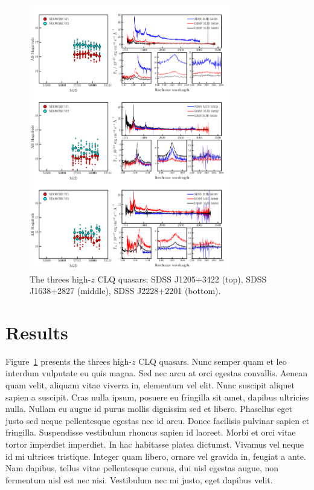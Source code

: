 \documentclass[a4paper,fleqn,usenatbib]{mnras}
\begin{document}
\begin{figure}
  \centering
  \includegraphics[width=8.7cm, trim=0.2cm 0.2cm 0.2cm 0.2cm, clip]
  {../plots/spectral/The_3_CIV_CLQs_20190917.pdf}
   \vspace{-12pt}
  \caption[]{The threes high-$z$ CLQ quasars; 
SDSS J1205+3422 (top), 
SDSS J1638+2827 (middle), 
SDSS J2228+2201 (bottom). 
}
  \label{fig:civ_clqs}
\end{figure}
\section{Results}
Figure~\ref{fig:civ_clqs} presents the threes high-$z$ CLQ quasars. 
Nunc semper quam et leo interdum vulputate eu quis magna. Sed nec arcu
at orci egestas convallis. Aenean quam velit, aliquam vitae viverra
in, elementum vel elit. Nunc suscipit aliquet sapien a suscipit. Cras
nulla ipsum, posuere eu fringilla sit amet, dapibus ultricies
nulla. Nullam eu augue id purus mollis dignissim sed et
libero. Phasellus eget justo sed neque pellentesque egestas nec id
arcu. Donec facilisis pulvinar sapien et fringilla. Suspendisse
vestibulum rhoncus sapien id laoreet. Morbi et orci vitae tortor
imperdiet imperdiet. In hac habitasse platea dictumst. Vivamus vel
neque id mi ultrices tristique. Integer quam libero, ornare vel
gravida in, feugiat a ante. Nam dapibus, tellus vitae pellentesque
cursus, dui nisl egestas augue, non fermentum nisl est nec
nisi. Vestibulum nec mi justo, eget dapibus velit.
\end{document}
